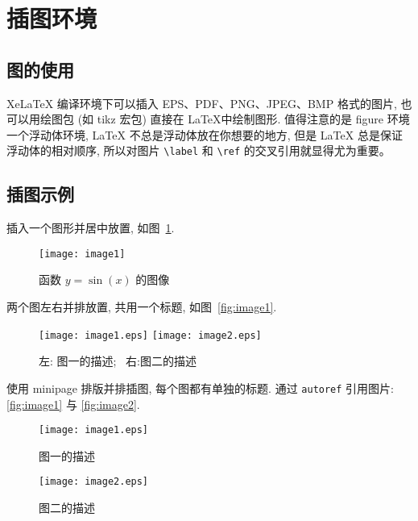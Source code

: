 \documentclass[12pt,final]{article}
\numberwithin{equation}{section}
\numberwithin{figure}{section}
\numberwithin{table}{section}
\theoremstyle{plain}
\begin{document}

\clearpage
\section{插图环境}

\subsection{图的使用}

XeLaTeX 编译环境下可以插入 EPS、PDF、PNG、JPEG、BMP 格式的图片, 也可以用绘图包 (如 tikz 宏包) 直接在 \LaTeX 中绘制图形. 值得注意的是 figure 环境一个浮动体环境, LaTeX 不总是浮动体放在你想要的地方, 但是 LaTeX 总是保证浮动体的相对顺序, 所以对图片 \verb|\label| 和 \verb|\ref| 的交叉引用就显得尤为重要。

\subsection{插图示例}

插入一个图形并居中放置, 如图~\ref{fig:sinx}.
\begin{figure}[htp!]
  \centering
  \texttt{[image: image1]}
  \caption{函数 $y=\sin(x)$ 的图像}\label{fig:sinx}
  \vspace{-2ex}
\end{figure}

两个图左右并排放置, 共用一个标题, 如图~\ref{fig:image1}.

\begin{figure}[htp!]
  \centering
  \texttt{[image: image1.eps]}
  \hfill
  \texttt{[image: image2.eps]}
  \caption{左: 图一的描述;~ 右:图二的描述}
  \label{fig:image}
  \vspace{-2ex}
\end{figure}

使用 minipage 排版并排插图, 每个图都有单独的标题. 通过 \verb|autoref| 引用图片: \autoref{fig:image1} 与 \autoref{fig:image2}.
\begin{figure}[htp!]
\begin{minipage}[t]{0.48\linewidth}
  \centering
  \texttt{[image: image1.eps]}
  \caption{图一的描述}
  \label{fig:image1}
\end{minipage}
\hfill
\begin{minipage}[t]{0.48\linewidth}
  \centering
  \texttt{[image: image2.eps]}
  \caption{图二的描述}
  \label{fig:image2}
\end{minipage}
\end{figure}
\end{document}
